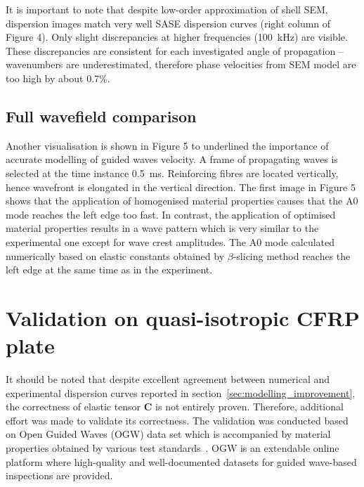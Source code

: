 \documentclass[preprint,12pt]{elsarticle}
\newcommand{\matr}[1]{\mathbf{#1}} %
\begin{document}
It is important to note that despite low-order approximation of shell SEM, dispersion images match very well SASE dispersion curves (right column of Figure 4). 
Only slight discrepancies at higher frequencies (100~kHz) are visible. 
These discrepancies are consistent for each investigated angle of propagation – wavenumbers are underestimated, therefore phase velocities from SEM model are too high by about 0.7\%.
\subsection{Full wavefield comparison}
Another visualisation is shown in Figure 5 to underlined the importance of accurate modelling of guided waves velocity. 
A frame of propagating waves is selected at the time instance 0.5~ms. 
Reinforcing fibres are located vertically, hence wavefront is elongated in the vertical direction.
The first image in Figure 5 shows that the application of homogenised material properties causes that the A0 mode reaches the left edge too fast. 
In contrast, the application of optimised material properties results in a wave pattern which is very similar to the experimental one except for wave crest amplitudes. 
The A0 mode calculated numerically based on elastic constants obtained by $\beta$-slicing method reaches the left edge at the same time as in the experiment.
\section{Validation on quasi-isotropic CFRP plate}
It should be noted that despite excellent agreement between numerical and experimental dispersion curves reported in section~\ref{sec:modelling_improvement}, the correctness of elastic tensor $\matr{C}$ is not entirely proven.
Therefore, additional effort was made to validate its correctness.
The validation was conducted based on Open Guided Waves (OGW) data set which is accompanied by material properties obtained by various test standards~\cite{Moll2019}.
OGW is an extendable online platform where high-quality and well-documented datasets for guided wave-based inspections are provided.
\end{document}
